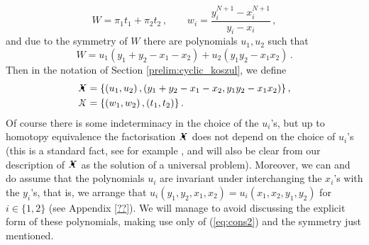 \documentclass{compositio}
\theoremstyle{definition}
\numberwithin{equation}{section}
\begin{document}
\begin{equation}\label{eq:cons1}
W = \pi_1 t_1 + \pi_2 t_2 \, , \qquad w_i = \frac{y_i^{N+1} - x_i^{N+1}}{y_i - x_i} \, ,
\end{equation}
and due to the symmetry of $W$ there are polynomials $u_1,u_2$ such that
\begin{equation}\label{eq:cons2}
W = u_1 ( y_1 + y_2 - x_1 - x_2 ) + u_2 ( y_1 y_2 - x_1 x_2 ) \, .
\end{equation}
Then in the notation of Section \ref{prelim:cyclic_koszul}, we define
\begin{align}
\Xbul &= \{ (u_1, u_2)\, , (y_1 + y_2 - x_1 - x_2, y_1 y_2 - x_1 x_2) \} \, , \nonumber \\
\Xcirc &= \{ (w_1, w_2) \, , (t_1, t_2) \}\,. \label{XbulXcirc}
\end{align}
Of course there is some indeterminacy in the choice of the $u_i$'s, but up to homotopy equivalence the factorisation $\Xbul$ does not depend on the choice of $u_i$'s (this is a standard fact, see for example \cite{??}, and will also be clear from our description of $\Xbul$ as the solution of a universal problem). Moreover, we can and do assume that the polynomials $u_i$ are invariant under interchanging the $x_{i}$'s with the $y_{i}$'s, that is, we arrange that $u_i(y_1,y_2,x_1,x_2) = u_i(x_1,x_2,y_1,y_2)$ for $i \in \{ 1,2 \}$ (see Appendix \ref{??}). We will manage to avoid discussing the explicit form of these polynomials, making use only of (\ref{eq:cons2}) and the symmetry just mentioned.
\end{document}
